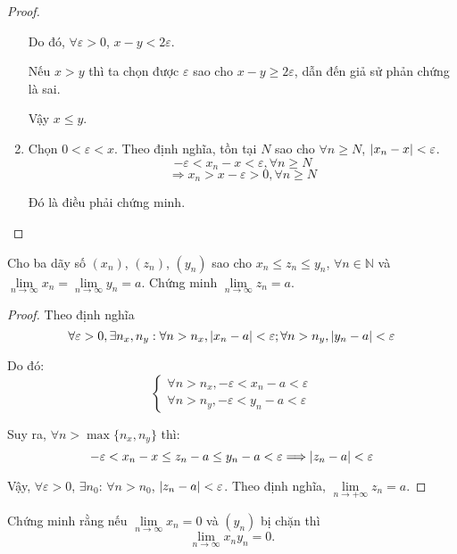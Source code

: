 \documentclass[class=analysis,crop=false]{standalone}
\begin{document}
\begin{proof}
\begin{enumerate}[label = (\roman*)]
            \par Do đó, $\forall\varepsilon > 0$, $x - y < 2\varepsilon$.
            \par Nếu $x > y$ thì ta chọn được $\varepsilon$ sao cho $x - y \ge 2\varepsilon$, dẫn đến giả sử phản chứng là sai.
            \par Vậy $x\le y$.
        \item Chọn $0 < \varepsilon < x$. Theo định nghĩa, tồn tại $N$ sao cho $\forall n \ge N$, $\left\vert{x_{n} - x}\right\vert < \varepsilon$.
            \[
                -\varepsilon < x_{n} - x < \varepsilon, \forall n\ge N
            \]
            \[
                \Rightarrow x_{n} > x - \varepsilon > 0, \forall n\ge N
            \]
            \par Đó là điều phải chứng minh.
    \end{enumerate}
\end{proof}

\begin{exercise}
    Cho ba dãy số $(x_{n})$, $(z_{n})$, $(y_{n})$ sao cho $x_{n} \le z_{n} \le y_{n}$, $\forall n\in\mathbb{N}$ và $\lim\limits_{n\to\infty} x_{n} = \lim\limits_{n\to\infty} y_{n} = a$. Chứng minh $\lim\limits_{n\to\infty} z_{n} = a$.
\end{exercise}

\begin{proof}
    \par Theo định nghĩa
    \[
        \forall\varepsilon > 0, \exists n_{x}, n_{y}: \forall n > n_{x}, \left\vert{x_{n} - a}\right\vert < \varepsilon; \forall n > n_{y}, \left\vert{y_{n} - a}\right\vert < \varepsilon
    \]
    \par Do đó:
    \[
        \begin{cases}
            \forall n > n_{x}, -\varepsilon < x_{n} - a < \varepsilon \\
            \forall n > n_{y}, -\varepsilon < y_{n} - a < \varepsilon
        \end{cases}
    \]
    \par Suy ra, $\forall n > \max\{ n_{x}, n_{y} \}$ thì:
    \[
        -\varepsilon < x_{n} - x \le z_{n} - a \le y_{n} - a < \varepsilon \Longrightarrow \left\vert{z_{n} - a}\right\vert < \varepsilon
    \]
    \par Vậy, $\forall\varepsilon > 0$, $\exists n_{0}$: $\forall n > n_{0}$, $\left\vert{z_{n} - a}\right\vert < \varepsilon$. Theo định nghĩa, $\lim\limits_{n\to+\infty}z_{n} = a$.
\end{proof}

\begin{exercise}
    Chứng minh rằng nếu $\lim\limits_{n\to\infty} x_{n} = 0$ và $(y_{n})$ bị chặn thì
    \[
        \lim\limits_{n\to\infty} x_{n}y_{n} = 0.
    \]
\end{exercise}
\end{document}

